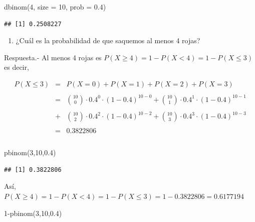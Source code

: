 \documentclass[
]{article}
\newenvironment{Shaded}{\begin{snugshade}}{\end{snugshade}}
\newcommand{\AttributeTok}[1]{\textcolor[rgb]{0.77,0.63,0.00}{#1}}
\newcommand{\DecValTok}[1]{\textcolor[rgb]{0.00,0.00,0.81}{#1}}
\newcommand{\FloatTok}[1]{\textcolor[rgb]{0.00,0.00,0.81}{#1}}
\newcommand{\FunctionTok}[1]{\textcolor[rgb]{0.00,0.00,0.00}{#1}}
\newcommand{\NormalTok}[1]{#1}
\newcommand{\SpecialCharTok}[1]{\textcolor[rgb]{0.00,0.00,0.00}{#1}}
\providecommand{\tightlist}{%
  \setlength{\itemsep}{0pt}\setlength{\parskip}{0pt}}
\begin{document}
\begin{Shaded}
\begin{Highlighting}[]
\FunctionTok{dbinom}\NormalTok{(}\DecValTok{4}\NormalTok{, }\AttributeTok{size =} \DecValTok{10}\NormalTok{, }\AttributeTok{prob =} \FloatTok{0.4}\NormalTok{)}
\end{Highlighting}
\end{Shaded}

\begin{verbatim}
## [1] 0.2508227
\end{verbatim}

\begin{enumerate}
\def\labelenumi{\arabic{enumi}.}
\setcounter{enumi}{1}
\tightlist
\item
  ¿Cuál es la probabilidad de que saquemos al menos 4 rojas?
\end{enumerate}

Respuesta.- Al menos 4 rojas es
\(P(X\geq 4) = 1 - P(X<4) = 1 - P(X\leq 3)\) es decir,

\[\begin{array}{rcl}
    P(X\leq 3)&=&P(X=0) + P(X=1) + P(X=2) + P(X=3)\\\\
    &=&\displaystyle {10\choose 0}\cdot 0.4^0 \cdot (1-0.4)^{10-0} + {10\choose 1}\cdot 0.4^1 \cdot (1-0.4)^{10-1}\\\\ 
    &+& \displaystyle {10\choose 2}\cdot 0.4^2 \cdot (1-0.4)^{10-2} + {10\choose 3}\cdot 0.4^3 \cdot (1-0.4)^{10-3} \\\\
    &=&0.3822806\\\\
  \end{array}\]

\begin{Shaded}
\begin{Highlighting}[]
\FunctionTok{pbinom}\NormalTok{(}\DecValTok{3}\NormalTok{,}\DecValTok{10}\NormalTok{,}\FloatTok{0.4}\NormalTok{)}
\end{Highlighting}
\end{Shaded}

\begin{verbatim}
## [1] 0.3822806
\end{verbatim}

Así,
\(P(X\geq 4) = 1-P(X<4) = 1 - P(X\leq 3) = 1 - 0.3822806 = 0.6177194\)

\begin{Shaded}
\begin{Highlighting}[]
\DecValTok{1}\SpecialCharTok{{-}}\FunctionTok{pbinom}\NormalTok{(}\DecValTok{3}\NormalTok{,}\DecValTok{10}\NormalTok{,}\FloatTok{0.4}\NormalTok{)}
\end{Highlighting}
\end{Shaded}
\end{document}

